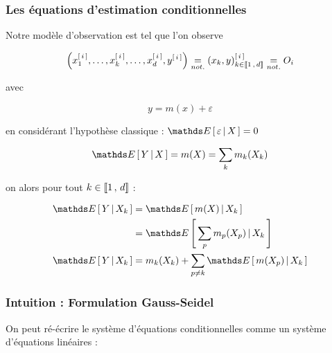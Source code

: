 {


    \subsubsection{Les équations d'estimation conditionnelles}
    {
        Notre modèle d'observation est tel que l'on observe 

        \begin{equation*}
            \left(x_1^{[ \, i\, ]}, \dots, x_k^{[ \, i\, ]}, \dots, x_d^{[ \, i\, ]}, y^{[ \, i\, ]}\right) \underset{not.}{=} (x_k, y)^{[ \, i\, ]}_{k \in \llbracket 1 \, , \, d \rrbracket} \underset{not.}{=} O_i
        \end{equation*}

        avec

        \begin{equation*}
            y = m(x) + \varepsilon
        \end{equation*}

        en considérant l'hypothèse classique : $\esperancesachant X \varepsilon = 0$

        \begin{equation}
            \esperancesachant {X} Y = m(X) = \sum_k m_k(X_k)
        \end{equation}

        on alors pour tout $k \in \llbracket 1 \, , \, d \rrbracket$ : 

        \begin{align}
            \esperancesachant{X_k} Y & = \esperancesachant{X_k}{m(X)}
            \notag \\
                                    & =\esperancesachant{X_k}{\sum_p m_p(X_p)}
            \notag \\
            \esperancesachant{X_k} Y & = m_k(X_k) + \sum_{p\neq k}\esperancesachant{X_k}{m(X_p)} \label{eq:eq_estim_cond_gam}
        \end{align}
    }
    \subsubsection{Intuition : Formulation Gauss-Seidel}
    {

        \noindent On peut ré-écrire le système d'équations conditionnelles comme un système d'équations linéaires\cite{hastie1990generalized} :

}}
